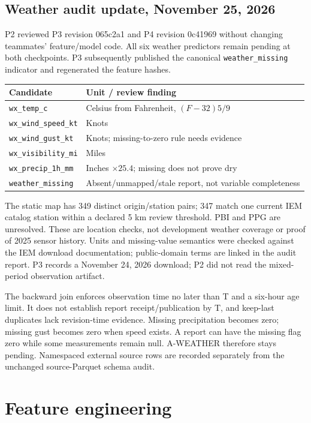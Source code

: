 \documentclass{article}
\begin{document}
\subsection{Weather audit update, November 25, 2026}
P2 reviewed P3 revision 065c2a1 and P4 revision 0c41969 without changing teammates' feature/model code. All six weather predictors remain pending at both checkpoints. P3 subsequently published the canonical \texttt{weather\_missing} indicator and regenerated the feature hashes.
\begin{center}\small\begin{tabular}{ll}\toprule
Candidate & Unit / review finding \\\midrule
\texttt{wx\_temp\_c} & Celsius from Fahrenheit, $(F-32)5/9$ \\
\texttt{wx\_wind\_speed\_kt} & Knots \\
\texttt{wx\_wind\_gust\_kt} & Knots; missing-to-zero rule needs evidence \\
\texttt{wx\_visibility\_mi} & Miles \\
\texttt{wx\_precip\_1h\_mm} & Inches $\times25.4$; missing does not prove dry \\
\texttt{weather\_missing} & Absent/unmapped/stale report, not variable completeness \\
\bottomrule\end{tabular}\end{center}
The static map has 349 distinct origin/station pairs; 347 match one current IEM catalog station within a declared 5 km review threshold. PBI and PPG are unresolved. These are location checks, not development weather coverage or proof of 2025 sensor history. Units and missing-value semantics were checked against the IEM download documentation; public-domain terms are linked in the audit report. P3 records a November 24, 2026 download; P2 did not read the mixed-period observation artifact.

The backward join enforces observation time no later than T and a six-hour age limit. It does not establish report receipt/publication by T, and keep-last duplicates lack revision-time evidence. Missing precipitation becomes zero; missing gust becomes zero when speed exists. A report can have the missing flag zero while some measurements remain null. A-WEATHER therefore stays pending. Namespaced external source rows are recorded separately from the unchanged source-Parquet schema audit.

\section{Feature engineering}
\end{document}
